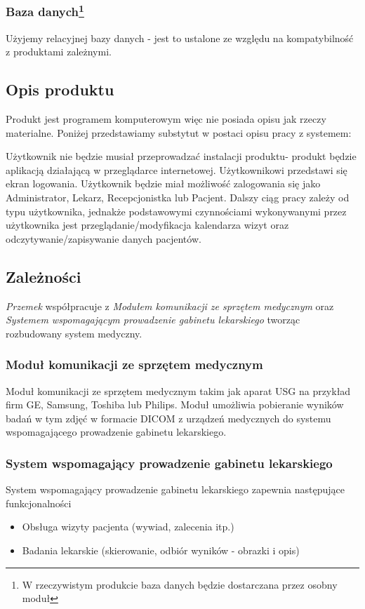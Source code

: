 \documentclass[10pt,a4paper]{article}
\begin{document}
\subsubsection[Baza danych]{Baza danych\footnote{W rzeczywistym produkcie baza danych będzie dostarczana przez osobny moduł}}

Użyjemy relacyjnej bazy danych - jest to ustalone ze względu na kompatybilność z produktami zależnymi.

\subsection{Opis produktu}
Produkt jest programem komputerowym więc nie posiada opisu jak rzeczy materialne. Poniżej przedstawiamy substytut w postaci opisu pracy z systemem:

Użytkownik nie będzie musiał przeprowadzać instalacji produktu- produkt będzie aplikacją działającą w przeglądarce internetowej. Użytkownikowi przedstawi się ekran logowania. Użytkownik będzie miał możliwość zalogowania się jako Administrator, Lekarz, Recepcjonistka lub Pacjent. Dalszy ciąg pracy zależy od typu użytkownika, jednakże podstawowymi czynnościami wykonywanymi przez użytkownika jest przeglądanie/modyfikacja kalendarza wizyt oraz odczytywanie/zapisywanie danych pacjentów.

\subsection{Zależności}
\emph{Przemek} współpracuje z \emph{Modułem komunikacji ze sprzętem medycznym} oraz \emph{Systemem wspomagającym prowadzenie gabinetu lekarskiego} tworząc rozbudowany system medyczny.

\subsubsection{Moduł komunikacji ze sprzętem medycznym}
Moduł komunikacji ze sprzętem medycznym takim jak aparat USG na przykład firm GE, Samsung, Toshiba lub Philips. Moduł umożliwia pobieranie wyników badań w tym zdjęć w formacie DICOM z urządzeń medycznych do systemu wspomagającego prowadzenie gabinetu lekarskiego.
\subsubsection{System wspomagający prowadzenie gabinetu lekarskiego}
System wspomagający prowadzenie gabinetu lekarskiego zapewnia następujące funkcjonalności
\begin{itemize}
  \item Obsługa wizyty pacjenta (wywiad, zalecenia itp.)
  \item Badania lekarskie (skierowanie, odbiór wyników - obrazki i opis)
\end{itemize}
\end{document}
